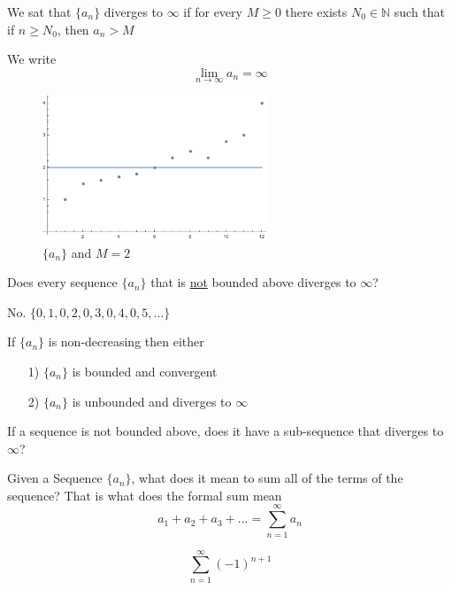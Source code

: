 
\begin{defn}
We sat that $\{a_n\}$ diverges to $\infty$ if for every $M\geq 0$ there exists $N_0\in \mathbb{N}$ such that if $n\geq N_0$, then $a_n>M$

We write $$\lim_{n\to \infty} a_n = \infty$$
\end{defn}


\begin{figure}[ht]
\centering
\includegraphics[width=0.6\textwidth]{picture/2.png}
\caption{$\{a_n\}$ and $M=2$}
\end{figure}

\begin{ques}
Does every sequence $\{a_n\}$ that is \underline{not} bounded above diverges to $\infty$? 
\end{ques} 

No. $\{0,1,0,2,0,3,0,4,0,5,\dots\}$

\begin{note}
 If $\{a_n\}$ is non-decreasing then either 
\begin{enumerate}
\item[1)] $\{a_n\}$ is bounded and convergent
\item[2)] $\{a_n\}$ is unbounded and diverges to $\infty$
\end{enumerate}
\end{note}

\begin{ques}
If a sequence is not bounded above, does it have a sub-sequence that diverges to $\infty$?
\end{ques} 


Given a Sequence $\{a_n\}$, what does it mean to sum all of the terms of the sequence? That is what does the formal sum mean $$a_1+a_2+a_3+\dots = \sum_{n=1}^{\infty} a_n$$

\begin{exmp}
 $$\sum_{n=1}^\infty (-1)^{n+1}$$
\end{exmp}

